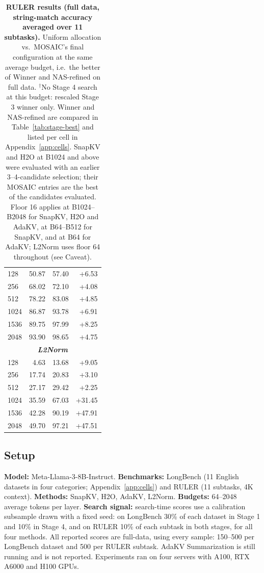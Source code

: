 \documentclass[11pt]{article}
\begin{document}
\begin{table}[t]
\begin{tabular}{@{} l r r r @{}}
    128 & 50.87 & 57.40 & +6.53 \\
    \rowcolor{gray!10}
    256 & 68.02 & 72.10 & +4.08 \\
    512 & 78.22 & 83.08 & +4.85 \\
    \rowcolor{gray!10}
    1024 & 86.87 & 93.78 & +6.91 \\
    1536 & 89.75 & 97.99 & +8.25 \\
    \rowcolor{gray!10}
    2048 & 93.90 & 98.65 & +4.75 \\
    \midrule
    \multicolumn{4}{c}{\textbf{\textit{L2Norm}}} \\
    \midrule
    \rowcolor{gray!10}
    128 & 4.63 & 13.68 & +9.05 \\
    256 & 17.74 & 20.83 & +3.10 \\
    \rowcolor{gray!10}
    512 & 27.17 & 29.42 & +2.25 \\
    1024 & 35.59 & 67.03 & +31.45 \\
    \rowcolor{gray!10}
    1536 & 42.28 & 90.19 & +47.91 \\
    2048 & 49.70 & 97.21 & +47.51 \\
    \bottomrule
  \end{tabular}
  \caption{\textbf{RULER results (full data, string-match accuracy averaged over 11 subtasks).} Uniform allocation vs.\ MOSAIC's final configuration at the same average budget, i.e.\ the better of Winner and NAS-refined on full data. $^\dagger$No Stage 4 search at this budget: rescaled Stage 3 winner only. Winner and NAS-refined are compared in Table~\ref{tab:stage-best} and listed per cell in Appendix~\ref{app:cells}. SnapKV and H2O at B1024 and above were evaluated with an earlier 3--4-candidate selection; their MOSAIC entries are the best of the candidates evaluated. Floor 16 applies at B1024--B2048 for SnapKV, H2O and AdaKV, at B64--B512 for SnapKV, and at B64 for AdaKV; L2Norm uses floor 64 throughout (see Caveat).}
  \label{tab:ruler-summary}
\end{table}


\subsection{Setup}

\textbf{Model:} Meta-Llama-3-8B-Instruct. \textbf{Benchmarks:} LongBench (11 English datasets in four categories; Appendix~\ref{app:cells}) and RULER (11 subtasks, 4K context). \textbf{Methods:} SnapKV, H2O, AdaKV, L2Norm. \textbf{Budgets:} 64–2048 average tokens per layer. \textbf{Search signal:} search-time scores use a calibration subsample drawn with a fixed seed: on LongBench 30\% of each dataset in Stage 1 and 10\% in Stage 4, and on RULER 10\% of each subtask in both stages, for all four methods. All reported scores are full-data, using every sample: 150–500 per LongBench dataset and 500 per RULER subtask. AdaKV Summarization is still running and is not reported. Experiments ran on four servers with A100, RTX A6000 and H100 GPUs.
\end{document}
